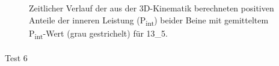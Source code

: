 \documentclass[
  letterpaper,
  DIV=11]{scrartcl}
\makeatletter
\let\oldparagraph\paragraph
\renewcommand{\paragraph}{
    \@ifstar
      \xxxParagraphStar
      \xxxParagraphNoStar
  }
\newcommand{\xxxParagraphStar}[1]{\oldparagraph*{#1}\mbox{}}
\newcommand{\xxxParagraphNoStar}[1]{\oldparagraph{#1}\mbox{}}
\makeatother
\begin{document}
\begin{figure}


\caption{\label{fig-PInt_Kinematik_13_5}Zeitlicher Verlauf der aus der
3D-Kinematik berechneten positiven Anteile der inneren Leistung
(P\textsubscript{int}) beider Beine mit gemitteltem
P\textsubscript{int}-Wert (grau gestrichelt) für 13\_5.}

\end{figure}%

\paragraph{Test 6}
\end{document}
